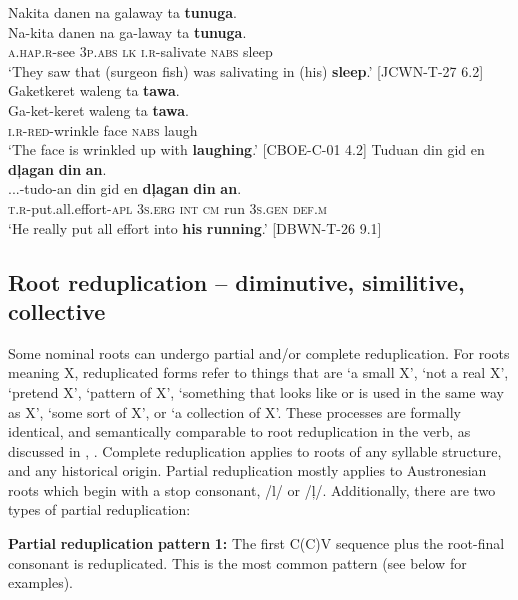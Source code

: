 \ea
Nakita  danen  na  galaway  ta  \textbf{tunuga}. \\\smallskip
 \gll Na-kita  danen  na  ga-laway  ta  \textbf{tunuga}. \\
\textsc{a.hap.r}-see  3\textsc{p.abs}  \textsc{lk}  \textsc{i.r}-salivate  \textsc{nabs}  sleep \\
\glt ‘They saw that (surgeon fish) was salivating in (his) \textbf{sleep}.’ [JCWN-T-27 6.2]
\z
\ea
Gaketkeret  waleng  ta  \textbf{tawa}. \\\smallskip
 \gll Ga-ket-keret  waleng  ta  \textbf{tawa}. \\
\textsc{i.r-red}-wrinkle  face  \textsc{nabs}  laugh \\
\glt ‘The face is wrinkled up with \textbf{laughing}.’ [CBOE-C-01 4.2]
\z
\ea
Tuduan  din  gid  en  \textbf{dļagan}  \textbf{din}  \textbf{an}. \\\smallskip
 \gll ...-tudo-an  din  gid  en  \textbf{dļagan}  \textbf{din}  \textbf{an}. \\
\textsc{t.r}-put.all.effort-\textsc{apl}  3\textsc{s.erg}  \textsc{int}  \textsc{cm}  run  3\textsc{s.gen}  \textsc{def.m} \\
\glt ‘He really put all effort into \textbf{his} \textbf{running}.’ [DBWN-T-26 9.1]
\z

\subsection{Root reduplication – diminutive, similitive, collective}
\label{sec:rootreduplication}

Some nominal roots can undergo partial and/or complete reduplication. For roots meaning X, reduplicated forms refer to things that are ‘a small X’, ‘not a real X’, ‘pretend X’, ‘pattern of X’, ‘something that looks like or is used in the same way as X’, ‘some sort of X’, or ‘a collection of X’. These processes are formally identical, and semantically comparable to root reduplication in the verb, as discussed in , . Complete reduplication applies to roots of any syllable structure, and any historical origin. Partial reduplication mostly applies to Austronesian roots which begin with a stop consonant, /l/ or /ļ/. Additionally, there are two types of partial reduplication:

\textbf{Partial} \textbf{reduplication} \textbf{pattern} \textbf{1:} The first C(C)V sequence plus the root-final consonant is reduplicated. This is the most common pattern (see below for examples).

